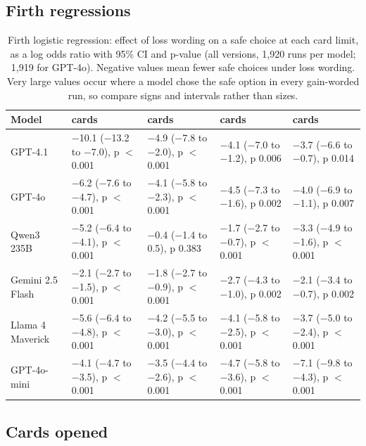 \documentclass[11pt]{article}
\begin{document}
\clearpage

\subsection{Firth regressions}

\begin{table}[ht]
\centering
\footnotesize
\caption{Firth logistic regression: effect of loss wording on a safe choice at each card limit, as a log odds ratio with 95\% CI and p-value (all versions, 1,920 runs per model; 1,919 for GPT-4o). Negative values mean fewer safe choices under loss wording. Very large values occur where a model chose the safe option in every gain-worded run, so compare signs and intervals rather than sizes.}
\label{tab:s3}
\setlength{\tabcolsep}{4pt}
\begin{tabularx}{\linewidth}{l>{\raggedright\arraybackslash}X>{\raggedright\arraybackslash}X>{\raggedright\arraybackslash}X>{\raggedright\arraybackslash}X}
\toprule
Model & 0 cards & 2 cards & 3 cards & 4 cards \\
\midrule
GPT-4.1 & $-$10.1 ($-$13.2 to $-$7.0), p $<$ 0.001 & $-$4.9 ($-$7.8 to $-$2.0), p $<$ 0.001 & $-$4.1 ($-$7.0 to $-$1.2), p 0.006 & $-$3.7 ($-$6.6 to $-$0.7), p 0.014 \\
GPT-4o & $-$6.2 ($-$7.6 to $-$4.7), p $<$ 0.001 & $-$4.1 ($-$5.8 to $-$2.3), p $<$ 0.001 & $-$4.5 ($-$7.3 to $-$1.6), p 0.002 & $-$4.0 ($-$6.9 to $-$1.1), p 0.007 \\
Qwen3 235B & $-$5.2 ($-$6.4 to $-$4.1), p $<$ 0.001 & $-$0.4 ($-$1.4 to 0.5), p 0.383 & $-$1.7 ($-$2.7 to $-$0.7), p $<$ 0.001 & $-$3.3 ($-$4.9 to $-$1.6), p $<$ 0.001 \\
Gemini 2.5 Flash & $-$2.1 ($-$2.7 to $-$1.5), p $<$ 0.001 & $-$1.8 ($-$2.7 to $-$0.9), p $<$ 0.001 & $-$2.7 ($-$4.3 to $-$1.0), p 0.002 & $-$2.1 ($-$3.4 to $-$0.7), p 0.002 \\
Llama 4 Maverick & $-$5.6 ($-$6.4 to $-$4.8), p $<$ 0.001 & $-$4.2 ($-$5.5 to $-$3.0), p $<$ 0.001 & $-$4.1 ($-$5.8 to $-$2.5), p $<$ 0.001 & $-$3.7 ($-$5.0 to $-$2.4), p $<$ 0.001 \\
GPT-4o-mini & $-$4.1 ($-$4.7 to $-$3.5), p $<$ 0.001 & $-$3.5 ($-$4.4 to $-$2.6), p $<$ 0.001 & $-$4.7 ($-$5.8 to $-$3.6), p $<$ 0.001 & $-$7.1 ($-$9.8 to $-$4.3), p $<$ 0.001 \\
\bottomrule
\end{tabularx}
\end{table}

\subsection{Cards opened}
\end{document}
